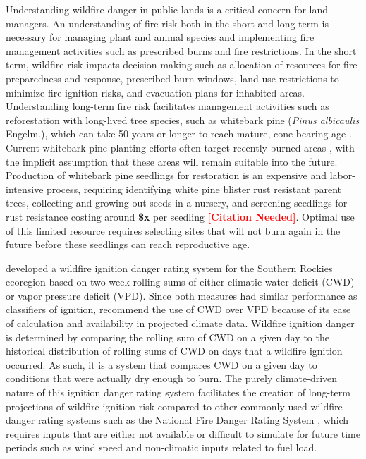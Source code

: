 \documentclass[11pt]{article}
\newcommand{\citethis}{\textbf{\textcolor{red}{[Citation Needed]}}}
\begin{document}
Understanding wildfire danger in public lands is a critical concern for land managers.  An understanding of fire risk both in the short and long term is necessary for managing plant and animal species and implementing fire management activities such as prescribed burns and fire restrictions. In the short term, wildfire risk impacts decision making such as allocation of resources for fire preparedness and response, prescribed burn windows, land use restrictions to minimize fire ignition risks, and evacuation plans for inhabited areas.  Understanding long-term fire risk facilitates management activities such as reforestation with long-lived tree species, such as whitebark pine (\textit{Pinus albicaulis} Engelm.), which can take 50 years or longer to reach mature, cone-bearing age \citep{tombackWhitebarkPineCommunities2001}. Current whitebark pine planting efforts often target recently burned areas \citep{keaneRangewideRestorationStrategy2012}, with the implicit assumption that these areas will remain suitable into the future. Production of whitebark pine seedlings for restoration is an expensive and labor-intensive process, requiring identifying white pine blister rust resistant parent trees, collecting and growing out seeds in a nursery, and screening seedlings for rust resistance costing around \textbf{\$x} per seedling \citethis.  Optimal use of this limited resource requires selecting sites that will not burn again in the future before these seedlings can reach reproductive age. 

\citet{thomaWaterBalanceIndicator2020} developed a wildfire ignition danger rating system for the Southern Rockies ecoregion \citep{omernikEcoregionsConterminousUnited1987} based on two-week rolling sums of either climatic water deficit (CWD) or vapor pressure deficit (VPD). Since both measures had similar performance as classifiers of ignition, \citet{thomaWaterBalanceIndicator2020} recommend the use of CWD over VPD because of its ease of calculation and availability in projected climate data.  Wildfire ignition danger is determined by comparing the rolling sum of CWD on a given day to the historical distribution of rolling sums of CWD on days that a wildfire ignition occurred. As such, it is a system that compares CWD on a given day to conditions that were actually dry enough to burn. The purely climate-driven nature of this ignition danger rating system facilitates the creation of long-term projections of wildfire ignition risk compared to other commonly used wildfire danger rating systems such as the National Fire Danger Rating System \citep{degrootChapter11Wildland2015}, which requires inputs that are either not available or difficult to simulate for future time periods such as wind speed and non-climatic inputs related to fuel load.  
\end{document}
